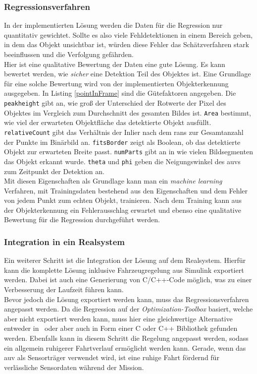 \subsubsection{Regressionsverfahren}
\label{sec_learnWeights}
In der implementierten Lösung werden die Daten für die Regression nur quantitativ gewichtet. Sollte es also viele Fehldetektionen in einem Bereich geben, in dem das Objekt unsichtbar ist, würden diese Fehler das Schätzverfahren stark beeinflussen und die Verfolgung gefährden.\\
Hier ist eine qualitative Bewertung der Daten eine gute Lösung. Es kann bewertet werden, wie \textit{sicher} eine Detektion Teil des Objektes ist. Eine Grundlage für eine solche Bewertung wird von der implementierten Objekterkennung ausgegeben. In Listing \ref{pointInFrame} sind die Gütefaktoren angegeben. Die \texttt{peakheight} gibt an, wie groß der Unterschied der Rotwerte der Pixel des Objektes im Vergleich zum Durchschnitt des gesamten Bildes ist. \texttt{Area} bestimmt, wie viel der erwarteten Objektfläche das detektierte Objekt ausfüllt. \texttt{relativeCount} gibt das Verhältnis der Inlier nach dem \gls{rans} zur Gesamtanzahl der Punkte im Binärbild an. \texttt{fitsBorder} zeigt als Boolean, ob das detektierte Objekt zur erwarteten Breite passt. \texttt{numParts} gibt an in wie vielen Bildsegmenten das Objekt erkannt wurde. \texttt{theta} und \texttt{phi} geben die Neigungswinkel des \gls{auv}s zum Zeitpunkt der Detektion an.\\
Mit diesen Eigenschaften als Grundlage kann man ein \textit{machine learning} Verfahren, mit Trainingsdaten bestehend aus den Eigenschaften und dem Fehler von jedem Punkt zum echten Objekt, trainieren. Nach dem Training kann aus der Objekterkennung ein Fehlerausschlag erwartet und ebenso eine qualitative Bewertung für die Regression durchgeführt werden.

\subsubsection{Integration in ein Realsystem}
\label{sec_real}
Ein weiterer Schritt ist die Integration der Lösung auf dem Realsystem. Hierfür kann die komplette Lösung inklusive Fahrzeugregelung aus Simulink exportiert werden. Dabei ist auch eine Generierung von C/C++-Code möglich, was zu einer Verbesserung der Laufzeit führen kann.\\
Bevor jedoch die Lösung exportiert werden kann, muss das Regressionsverfahren angepasst werden. Da die Regression auf der \textit{Optimization-Toolbox} basiert, welche aber nicht exportiert werden kann, muss hier eine gleichwertige Alternative entweder in \matlab\ oder aber auch in Form einer C oder C++ Bibliothek gefunden werden.
Ebenfalls kann in diesem Schritt die Regelung angepasst werden, sodass ein allgemein ruhigerer Fahrtverlauf ermöglicht werden kann. Gerade, wenn das \gls{auv} als Sensorträger verwendet wird, ist eine ruhige Fahrt fördernd für verlässliche Sensordaten während der Mission.
\cleardoublepage